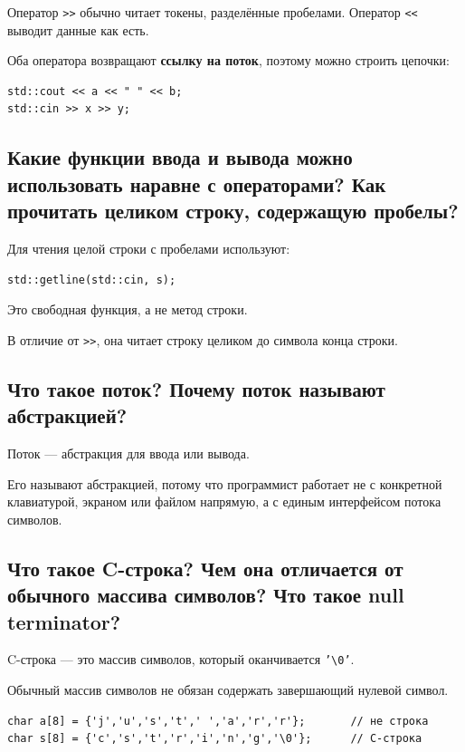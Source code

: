 Оператор \texttt{>>} обычно читает токены, разделённые пробелами.  
Оператор \texttt{<<} выводит данные как есть.

Оба оператора возвращают \textbf{ссылку на поток}, поэтому можно строить цепочки:
\begin{verbatim}
std::cout << a << " " << b;
std::cin >> x >> y;
\end{verbatim}


\subsection{Какие функции ввода и вывода можно использовать наравне с операторами? Как прочитать целиком строку, содержащую пробелы?}

Для чтения целой строки с пробелами используют:
\begin{verbatim}
std::getline(std::cin, s);
\end{verbatim}

Это свободная функция, а не метод строки.

В отличие от \texttt{>>}, она читает строку целиком до символа конца строки.


\subsection{Что такое поток? Почему поток называют абстракцией?}

Поток --- абстракция для ввода или вывода.

Его называют абстракцией, потому что программист работает не с конкретной клавиатурой, экраном или файлом напрямую, а с единым интерфейсом потока символов.


\subsection{Что такое C-строка? Чем она отличается от обычного массива символов? Что такое null terminator?}

C-строка --- это массив символов, который оканчивается \texttt{'\textbackslash 0'}.

Обычный массив символов не обязан содержать завершающий нулевой символ.

\begin{example}
\begin{verbatim}
char a[8] = {'j','u','s','t',' ','a','r','r'};       // не строка
char s[8] = {'c','s','t','r','i','n','g','\0'};      // C-строка
\end{verbatim}
\end{example}

